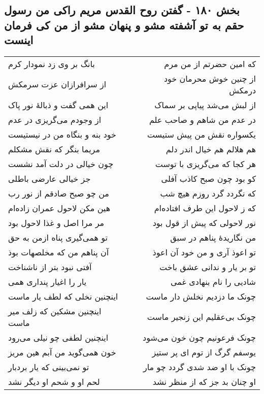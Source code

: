 \begin{center}
\section*{بخش ۱۸۰ - گفتن روح القدس مریم راکی من رسول حقم به تو آشفته مشو و پنهان مشو از  من کی فرمان اینست}
\label{sec:sh180}
\begin{longtable}{l p{0.5cm} r}
بانگ بر وی زد نمودار کرم
&&
که امین حضرتم از من مرم
\\
از سرافرازان عزت سرمکش
&&
از چنین خوش محرمان خود درمکش
\\
این همی گفت و ذبالهٔ نور پاک
&&
از لبش می‌شد پیاپی بر سماک
\\
از وجودم می‌گریزی در عدم
&&
در عدم من شاهم و صاحب علم
\\
خود بنه و بنگاه من در نیستیست
&&
یکسواره نقش من پیش ستیست
\\
مریما بنگر که نقش مشکلم
&&
هم هلالم هم خیال اندر دلم
\\
چون خیالی در دلت آمد نشست
&&
هر کجا که می‌گریزی با توست
\\
جز خیالی عارضی باطلی
&&
کو بود چون صبح کاذب آفلی
\\
من چو صبح صادقم از نور رب
&&
که نگردد گرد روزم هیچ شب
\\
هین مکن لاحول عمران زاده‌ام
&&
که ز لاحول این طرف افتاده‌ام
\\
مر مرا اصل و غذا لاحول بود
&&
نور لاحولی که پیش از قول بود
\\
تو همی‌گیری پناه ازمن به حق
&&
من نگاریدهٔ پناهم در سبق
\\
آن پناهم من که مخلصهات بوذ
&&
تو اعوذ آری و من خود آن اعوذ
\\
آفتی نبود بتر از ناشناخت
&&
تو بر یار و ندانی عشق باخت
\\
یار را اغیار پنداری همی
&&
شادیی را نام بنهادی غمی
\\
اینچنین نخلی که لطف یار ماست
&&
چونک ما دزدیم نخلش دار ماست
\\
اینچنین مشکین که زلف میر ماست
&&
چونک بی‌عقلیم این زنجیر ماست
\\
اینچنین لطفی چو نیلی می‌رود
&&
چونک فرعونیم چون خون می‌شود
\\
خون همی‌گوید من آبم هین مریز
&&
یوسفم گرگ از توم ای پر ستیز
\\
تو نمی‌بینی که یار بردبار
&&
چونک با او ضد شدی گردد چو مار
\\
لحم او و شحم او دیگر نشد
&&
او چنان بد جز که از منظر نشد
\\
\end{longtable}
\end{center}

